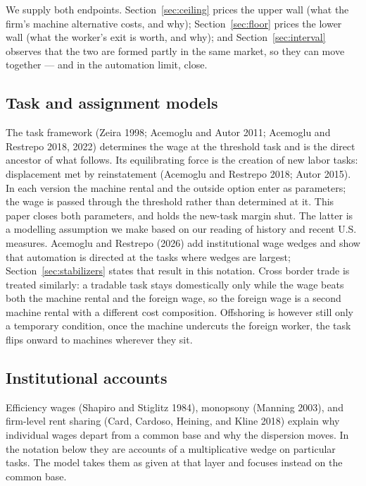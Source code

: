 \documentclass[12pt]{article}
\theoremstyle{plain}
\begin{document}
We supply both endpoints. Section~\ref{sec:ceiling} prices the upper wall (what the firm's machine alternative costs, and why); Section~\ref{sec:floor} prices the lower wall (what the worker's exit is worth, and why); and Section~\ref{sec:interval} observes that the two are formed partly in the same market, so they can move together --- and in the automation limit, close.

\subsection{Task and assignment models}\label{sec:tasks}

The task framework (Zeira 1998; Acemoglu and Autor 2011; Acemoglu and Restrepo 2018, 2022) determines the wage at the threshold task and is the direct ancestor of what follows. Its equilibrating force is the creation of new labor tasks: displacement met by reinstatement (Acemoglu and Restrepo 2018; Autor 2015). In each version the machine rental and the outside option enter as parameters; the wage is passed through the threshold rather than determined at it. This paper closes both parameters, and holds the new-task margin shut. The latter is a modelling assumption we make based on our reading of history and recent U.S. measures. Acemoglu and Restrepo (2026) add institutional wage wedges and show that automation is directed at the tasks where wedges are largest; Section~\ref{sec:stabilizers} states that result in this notation. Cross border trade is treated similarly: a tradable task stays domestically only while the wage beats both the machine rental and the foreign wage, so the foreign wage is a second machine rental with a different cost composition. Offshoring is however still only a temporary condition, once the machine undercuts the foreign worker, the task flips onward to machines wherever they sit.

\subsection{Institutional accounts}\label{sec:institutions}

Efficiency wages (Shapiro and Stiglitz 1984), monopsony (Manning 2003), and firm-level rent sharing (Card, Cardoso, Heining, and Kline 2018) explain why individual wages depart from a common base and why the dispersion moves. In the notation below they are accounts of a multiplicative wedge on particular tasks. The model takes them as given at that layer and focuses instead on the common base.
\end{document}
